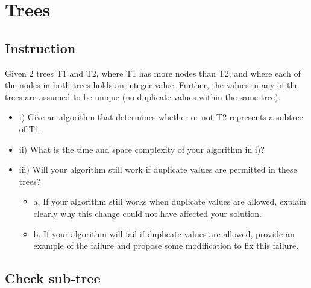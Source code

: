 \section{Trees}
\subsection{Instruction}

Given 2 trees T1 and T2, where T1 has more nodes than T2, and where each of the nodes in both
trees holds an integer value. Further, the values in any of the trees are assumed to be unique (no
duplicate values within the same tree).
\begin{itemize}
\item[] i) Give an algorithm that determines whether or not T2 represents a subtree of T1.
\item[] ii) What is the time and space complexity of your algorithm in i)?
\item[] iii) Will your algorithm still work if duplicate values are permitted in these trees?

\begin{itemize}
\item[] a. If your algorithm still works when duplicate values are allowed, explain clearly
why this change could not have affected your solution.
\item[] b. If your algorithm will fail if duplicate values are allowed, provide an example of
the failure and propose some modification to fix this failure. 
\end{itemize}
\end{itemize}

\subsection{Check sub-tree}


